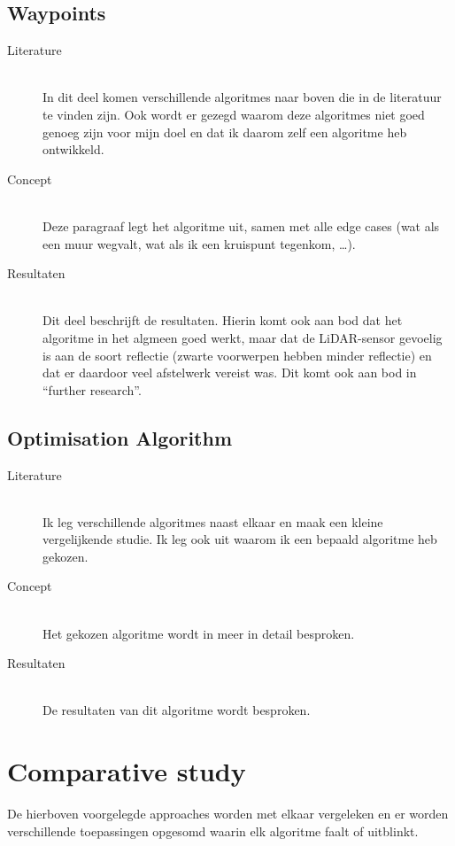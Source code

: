 \documentclass[conference,a4paper]{IEEEtran}
\begin{document}
\subsection{Waypoints}
\begin{description}
\item[Literature] \hfill \\ In dit deel komen verschillende algoritmes naar boven die in de literatuur te vinden zijn. Ook wordt er gezegd waarom deze algoritmes niet goed genoeg zijn voor mijn doel en dat ik daarom zelf een algoritme heb ontwikkeld.

\item[Concept] \hfill \\ Deze paragraaf legt het algoritme uit, samen met alle edge cases (wat als een muur wegvalt, wat als ik een kruispunt tegenkom, \ldots).

\item[Resultaten] \hfill \\ Dit deel beschrijft de resultaten. Hierin komt ook aan bod dat het algoritme in het algmeen goed werkt, maar dat de LiDAR-sensor gevoelig is aan de soort reflectie (zwarte voorwerpen hebben minder reflectie) en dat er daardoor veel afstelwerk vereist was. Dit komt ook aan bod in “further research”.

\end{description}

\subsection{Optimisation Algorithm}
\begin{description}
\item[Literature] \hfill \\ Ik leg verschillende algoritmes naast elkaar en maak een kleine vergelijkende studie. Ik leg ook uit waarom ik een bepaald algoritme heb gekozen.

\item[Concept] \hfill \\ Het gekozen algoritme wordt in meer in detail besproken.

\item[Resultaten] \hfill \\ De resultaten van dit algoritme wordt besproken.

\end{description}

\section{Comparative study}
De hierboven voorgelegde approaches worden met elkaar vergeleken en er worden verschillende toepassingen opgesomd waarin elk algoritme faalt of uitblinkt.
\end{document}
